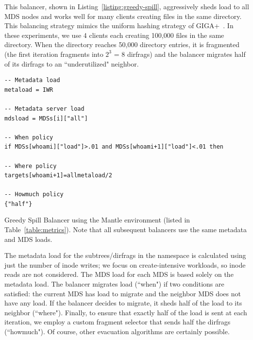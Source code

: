 This balancer, shown in Listing~\ref{listing:greedy-spill}, aggressively sheds load to all MDS nodes and works well for many clients creating files in the same directory. This balancing strategy mimics the uniform hashing strategy of GIGA+~\cite{patil:fast2011-giga+, ren:sc2014-indexfs}. In these experiments, we use 4 clients each creating 100,000 files in the same directory. When the directory reaches 50,000 directory entries, it is fragmented (the first iteration fragments into \(2^{3}\) = 8 dirfrags) and the balancer migrates half of its dirfrags to an ``underutilized" neighbor. 

\begin{listing}
	\ssp
	\begin{verbatim}
-- Metadata load
metaload = IWR

-- Metadata server load
mdsload = MDSs[i]["all"]

-- When policy
if MDSs[whoami]["load"]>.01 and MDSs[whoami+1]["load"]<.01 then

-- Where policy
targets[whoami+1]=allmetaload/2

-- Howmuch policy
{"half"}
	\end{verbatim}
	\dsp
    \caption{Greedy Spill Balancer using the Mantle environment (listed in Table~\ref{table:metrics}). Note that all subsequent balancers use the same metadata and MDS loads.\label{listing:greedy-spill}}
\end{listing}

The metadata load for the subtrees/dirfrags in the namespace is calculated using just the number of inode writes; we focus on create-intensive workloads, so inode reads are not considered. The MDS load for each MDS is based solely on the metadata load. The balancer migrates load (``when") if two conditions are satisfied: the current MDS has load to migrate and the neighbor MDS does not have any load. If the balancer decides to migrate, it sheds half of the load to its neighbor (``where"). Finally, to ensure that exactly half of the load is sent at each iteration, we employ a custom fragment selector that sends half the dirfrags (``howmuch"). Of course, other evacuation algorithms are certainly possible.

